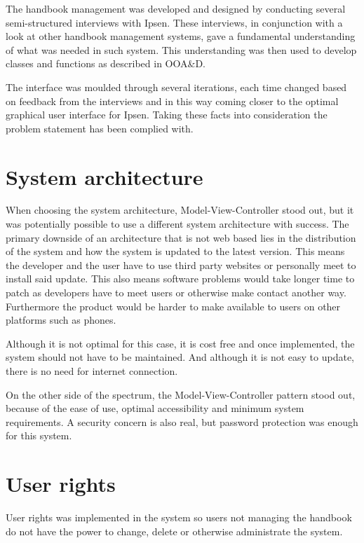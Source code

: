 The handbook management was developed and designed by conducting several semi-structured interviews with Ipsen.
These interviews, in conjunction with a look at other handbook management systems, gave a fundamental understanding of what was needed in such system.
This understanding was then used to develop classes and functions as described in OOA\&D\cite{Rod-Aalborg}.

The interface was moulded through several iterations, each time changed based on feedback from the interviews and in this way coming closer to the optimal graphical user interface for Ipsen.
Taking these facts into consideration the problem statement has been complied with.

\section{System architecture}
When choosing the system architecture, Model-View-Controller stood out, but it was potentially possible to use a different system architecture with success.
The primary downside of an architecture that is not web based lies in the distribution of the system and how the system is updated to the latest version.
This means the developer and the user have to use third party websites or personally meet to install said update.
This also means software problems would take longer time to patch as developers have to meet users or otherwise make contact another way.
Furthermore the product would be harder to make available to users on other platforms such as phones.

Although it is not optimal for this case, it is cost free and once implemented, the system should not have to be maintained.
And although it is not easy to update, there is no need for internet connection.

On the other side of the spectrum, the Model-View-Controller pattern stood out, because of the ease of use, optimal accessibility and minimum system requirements.
A security concern is also real, but password protection was enough for this system.

\section{User rights}

User rights was implemented in the system so users not managing the handbook do not have the power to change, delete or otherwise administrate the system.

